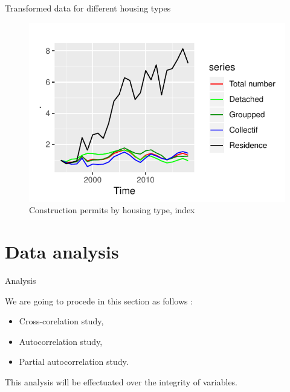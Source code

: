 \documentclass[11pt,ignorenonframetext,]{beamer}
\providecommand{\tightlist}{%
  \setlength{\itemsep}{0pt}\setlength{\parskip}{0pt}}
\begin{document}
\begin{frame}{Transformed data for different housing types}
\protect\hypertarget{transformed-data-for-different-housing-types}{}

\FloatBarrier

\tiny

\begin{figure}[!htbp]

{\centering \includegraphics{presentation_files/figure-beamer/unnamed-chunk-17-1} 

}

\caption{Construction permits by housing type, index}\label{fig:unnamed-chunk-17}
\end{figure}

\normalsize

\FloatBarrier

\end{frame}

\hypertarget{data-analysis}{%
\section{Data analysis}\label{data-analysis}}

\begin{frame}{Analysis}
\protect\hypertarget{analysis}{}

We are going to procede in this section as follows :

\begin{itemize}
\tightlist
\item
  Cross-corelation study,
\item
  Autocorrelation study,
\item
  Partial autocorrelation study.
\end{itemize}

This analysis will be effectuated over the integrity of variables.

\end{frame}
\end{document}
